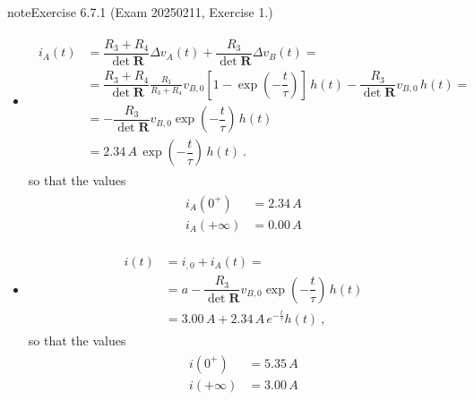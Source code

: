\documentclass[letterpaper,10pt,english]{jupyterBook}
\begin{document}
\begin{sphinxadmonition}{note}{Exercise 6.7.1 (Exam 2025\sphinxhyphen{}02\sphinxhyphen{}11, Exercise 1.)}
\begin{itemize}
\begin{equation*}
\end{equation*}
\item {} 
\sphinxAtStartPar
{}
\begin{equation*}
\begin{split}\begin{aligned}
     i_A(t)
     & = \dfrac{R_3+R_4}{\det \mathbf{R}} \Delta v_A(t) + \dfrac{R_3}{\det \mathbf{R}} \Delta v_B(t) = \\
     & = \dfrac{R_3+R_4}{\det \mathbf{R}} \frac{R_3}{R_3 + R_4} v_{B,0} \left[ 1 - \exp\left( - \dfrac{t}{\tau} \right) \right] \, h(t) - \dfrac{R_3}{\det \mathbf{R}} v_{B,0} \, h(t) = \\
     & = - \dfrac{R_3}{\det \mathbf{R}} v_{B,0} \exp\left( - \dfrac{t}{\tau} \right) \, h(t) \\
     & = 2.34 \, A \, \exp\left( - \dfrac{t}{\tau} \right) \, h(t) \ .
   \end{aligned}\end{split}
\end{equation*}
\sphinxAtStartPar
so that the values
\begin{equation*}
\begin{split}\begin{aligned}
     i_A(0^+)     & = 2.34 \, A \\
     i_A(+\infty) & = 0.00 \, A
   \end{aligned}\end{split}
\end{equation*}
\item {} 
\sphinxAtStartPar
{}
\begin{equation*}
\begin{split}\begin{aligned}
     i(t) 
     & = i_{,0} + i_A(t) = \\
     & = a - \dfrac{R_3}{\det \mathbf{R}} v_{B,0} \exp\left( - \dfrac{t}{\tau} \right) \, h(t) \\
     & = 3.00 \, A + 2.34 \, A \, e^{-\frac{t}{\tau}} h(t) \ ,
   \end{aligned}\end{split}
\end{equation*}
\sphinxAtStartPar
so that the values
\begin{equation*}
\begin{split}\begin{aligned}
     i(0^+)     & = 5.35 \, A \\
     i(+\infty) & = 3.00 \, A
   \end{aligned}\end{split}
\end{equation*}
\end{itemize}


\end{sphinxadmonition}
\end{document}
